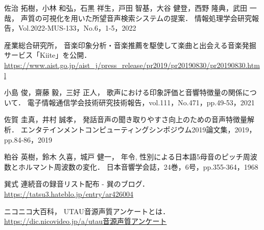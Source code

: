 \begin{thebibliography}{参考文献}
佐治 拓樹，小林 和弘，石黒 祥生，戸田 智基，大谷 健登，西野 隆典，武田 一哉，
声質の可視化を用いた所望音声検索システムの提案．
情報処理学会研究報告，Vol.2022-MUS-133，No.6，1-5，2022

産業総合研究所，
音楽印象分析・音楽推薦を駆使して楽曲と出会える音楽発掘サービス「Kiite」を公開．
\url{https://www.aist.go.jp/aist_j/press_release/pr2019/pr20190830/pr20190830.html}

小島 俊，齋藤 毅，三好 正人，
歌声における印象評価と音響特徴量の関係について．
電子情報通信学会技術研究技術報告，vol.111，No.471，pp.49-53，2021

佐賀 圭真，井村 誠孝，
発話音声の聞き取りやすさ向上のための音声特徴量解析．
エンタテインメントコンピューティングシンポジウム2019論文集，2019，pp.84-86，2019

粕谷 英樹，鈴木 久喜，城戸 健一，
年令, 性別による日本語5母音のピッチ周波数とホルマント周波数の変化．
日本音響学会誌，24巻，6号，pp.355-364，1968

巽式 連続音の録音リスト配布 - 巽のブログ．
\url{https://tatsu3.hateblo.jp/entry/ar426004}

ニコニコ大百科，
UTAU音源声質アンケートとは．
\url{https://dic.nicovideo.jp/a/utau音源声質アンケート}

\end{thebibliography}

